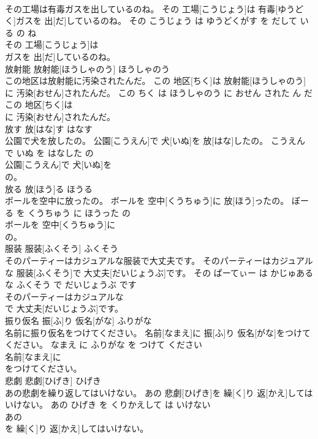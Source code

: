 \documentclass[8pt]{extreport}
\begin{document}
\begin{CJK}{UTF8}{min}
\\	その工場は有毒ガスを出しているのね。	その 工場[こうじょう]は 有毒[ゆうどく]ガスを 出[だ]しているのね。	その こうじょう は ゆうどくがす を だして いる の ね	
\\	その 工場[こうじょう]は
\\	ガスを 出[だ]しているのね。			
\\	放射能	放射能[ほうしゃのう]	ほうしゃのう	
\\	この地区は放射能に汚染されたんだ。	この 地区[ちく]は 放射能[ほうしゃのう]に 汚染[おせん]されたんだ。	この ちく は ほうしゃのう に おせん された ん だ	
\\	この 地区[ちく]は
\\	に 汚染[おせん]されたんだ。			
\\	放す	放[はな]す	はなす	
\\	公園で犬を放したの。	公園[こうえん]で 犬[いぬ]を 放[はな]したの。	こうえん で いぬ を はなした の	
\\	公園[こうえん]で 犬[いぬ]を
\\	の。			
\\	放る	放[ほう]る	ほうる	
\\	ボールを空中に放ったの。	ボールを 空中[くうちゅう]に 放[ほう]ったの。	ぼーる を くうちゅう に ほうった の	
\\	ボールを 空中[くうちゅう]に
\\	の。			
\\	服装	服装[ふくそう]	ふくそう	
\\	そのパーティーはカジュアルな服装で大丈夫です。	そのパーティーはカジュアルな 服装[ふくそう]で 大丈夫[だいじょうぶ]です。	その ぱーてぃー は かじゅある な ふくそう で だいじょうぶ です	
\\	そのパーティーはカジュアルな
\\	で 大丈夫[だいじょうぶ]です。			
\\	振り仮名	振[ふ]り 仮名[がな]	ふりがな	
\\	名前に振り仮名をつけてください。	名前[なまえ]に 振[ふ]り 仮名[がな]をつけてください。	なまえ に ふりがな を つけて ください	
\\	名前[なまえ]に
\\	をつけてください。			
\\	悲劇	悲劇[ひげき]	ひげき	
\\	あの悲劇を繰り返してはいけない。	あの 悲劇[ひげき]を 繰[く]り 返[かえ]してはいけない。	あの ひげき を くりかえして は いけない	
\\	あの
\\	を 繰[く]り 返[かえ]してはいけない。			

\end{CJK}
\end{document}
